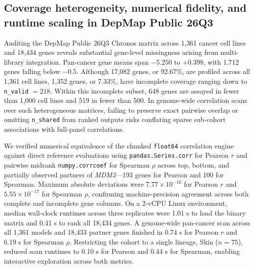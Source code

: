 \documentclass[11pt,a4paper]{article}
\begin{document}
\subsection{Coverage heterogeneity, numerical fidelity, and runtime scaling in DepMap Public 26Q3}
Auditing the DepMap Public 26Q3 Chronos matrix across 1,361 cancer cell lines and 18,434 genes reveals substantial gene-level missingness arising from multi-library integration. Pan-cancer gene means span $-5.250$ to $+0.398$, with 1,712 genes falling below $-0.5$. Although 17,082 genes, or 92.67\%, are profiled across all 1,361 cell lines, 1,352 genes, or 7.33\%, have incomplete coverage ranging down to \texttt{n\_valid} $= 218$. Within this incomplete subset, 648 genes are assayed in fewer than 1,000 cell lines and 519 in fewer than 500. In genome-wide correlation scans over such heterogeneous matrices, failing to preserve exact pairwise overlap or omitting \texttt{n\_shared} from ranked outputs risks conflating sparse sub-cohort associations with full-panel correlations.

We verified numerical equivalence of the chunked \texttt{float64} correlation engine against direct reference evaluations using \texttt{pandas.Series.corr} for Pearson $r$ and pairwise midrank \texttt{numpy.corrcoef} for Spearman $\rho$ across top, bottom, and partially observed partners of \textit{MDM2}---193 genes for Pearson and 100 for Spearman. Maximum absolute deviations were $7.77 \times 10^{-16}$ for Pearson $r$ and $5.55 \times 10^{-17}$ for Spearman $\rho$, confirming machine-precision agreement across both complete and incomplete gene columns. On a 2-vCPU Linux environment, median wall-clock runtimes across three replicates were 1.01 s to load the binary matrix and 0.41 s to rank all 18,434 genes. A genome-wide pan-cancer scan across all 1,361 models and 18,433 partner genes finished in 0.74 s for Pearson $r$ and 6.19 s for Spearman $\rho$. Restricting the cohort to a single lineage, Skin ($n = 75$), reduced scan runtimes to 0.10 s for Pearson and 0.44 s for Spearman, enabling interactive exploration across both metrics.
\end{document}
